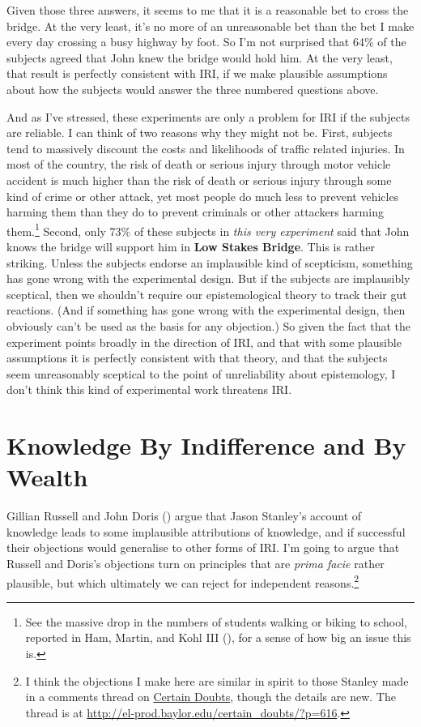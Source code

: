 \documentclass[
  10pt,
  letterpaper,
  DIV=11,
  numbers=noendperiod,
  twoside]{scrartcl}
\begin{document}
Given those three answers, it seems to me that it is a reasonable bet to
cross the bridge. At the very least, it's no more of an unreasonable bet
than the bet I make every day crossing a busy highway by foot. So I'm
not surprised that 64\% of the subjects agreed that John knew the bridge
would hold him. At the very least, that result is perfectly consistent
with IRI, if we make plausible assumptions about how the subjects would
answer the three numbered questions above.

And as I've stressed, these experiments are only a problem for IRI if
the subjects are reliable. I can think of two reasons why they might not
be. First, subjects tend to massively discount the costs and likelihoods
of traffic related injuries. In most of the country, the risk of death
or serious injury through motor vehicle accident is much higher than the
risk of death or serious injury through some kind of crime or other
attack, yet most people do much less to prevent vehicles harming them
than they do to prevent criminals or other attackers harming
them.\footnote{See the massive drop in the numbers of students walking
  or biking to school, reported in Ham, Martin, and Kohl III
  (), for a sense of how big an issue this
  is.} Second, only 73\% of these subjects in \emph{this very
experiment} said that John knows the bridge will support him in
\textbf{Low Stakes Bridge}. This is rather striking. Unless the subjects
endorse an implausible kind of scepticism, something has gone wrong with
the experimental design. But if the subjects are implausibly sceptical,
then we shouldn't require our epistemological theory to track their gut
reactions. (And if something has gone wrong with the experimental
design, then obviously can't be used as the basis for any objection.) So
given the fact that the experiment points broadly in the direction of
IRI, and that with some plausible assumptions it is perfectly consistent
with that theory, and that the subjects seem unreasonably sceptical to
the point of unreliability about epistemology, I don't think this kind
of experimental work threatens IRI.

\section{Knowledge By Indifference and By
Wealth}\label{knowledge-by-indifference-and-by-wealth}

Gillian Russell and John Doris ()
argue that Jason Stanley's account of knowledge leads to some
implausible attributions of knowledge, and if successful their
objections would generalise to other forms of IRI. I'm going to argue
that Russell and Doris's objections turn on principles that are
\emph{prima facie} rather plausible, but which ultimately we can reject
for independent reasons.\footnote{I think the objections I make here are
  similar in spirit to those Stanley made in a comments thread on
  \href{http://el-prod.baylor.edu/certain_doubts/?p=616}{Certain
  Doubts}, though the details are new. The thread is at
  \url{http://el-prod.baylor.edu/certain_doubts/?p=616}.}
\end{document}
